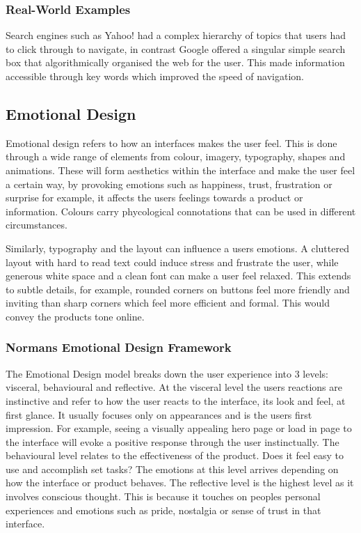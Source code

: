 \documentclass[]{project_final}
\begin{document}
\subsubsection{Real-World Examples}

Search engines such as Yahoo! had a complex hierarchy of topics that users had to click through to navigate, in contrast Google offered a singular simple search box that algorithmically organised the web for the user. This made information accessible through key words which improved the speed of navigation.


\subsection{Emotional Design}

Emotional design refers to how an interfaces makes the user feel. This is done through a wide range of elements from colour, imagery, typography, shapes and animations. These will form aesthetics within the interface and make the user feel a certain way, by provoking emotions such as happiness, trust, frustration or surprise for example, it affects the users feelings towards a product or information. Colours carry phycological connotations that can be used in different circumstances.\cite{noauthor_what_nodate}

Similarly, typography and the layout can influence a users emotions. A cluttered layout with hard to read text could induce stress and frustrate the user, while generous white space and a clean font can make a user feel relaxed. This extends to subtle details, for example, rounded corners on buttons feel more friendly and inviting than sharp corners which feel more efficient and formal. This would convey the products tone online.

\subsubsection{Normans Emotional Design Framework}
The Emotional Design model breaks down the user experience into 3 levels: visceral, behavioural and reflective. At the visceral level the users reactions are instinctive and refer to how the user reacts to the interface, its look and feel, at first glance. It usually focuses only on appearances and is the users first impression. For example, seeing a visually appealing hero page or load in page to the interface will evoke a positive response through the user instinctually.\cite{komninos_normans_2020}
The behavioural level relates to the effectiveness of the product. Does it feel easy to use and accomplish set tasks? The emotions at this level arrives depending on how the interface or product behaves.
The reflective level is the highest level as it involves conscious thought. This is because it touches on peoples personal experiences and emotions such as pride, nostalgia or sense of trust in that interface.
\end{document}
